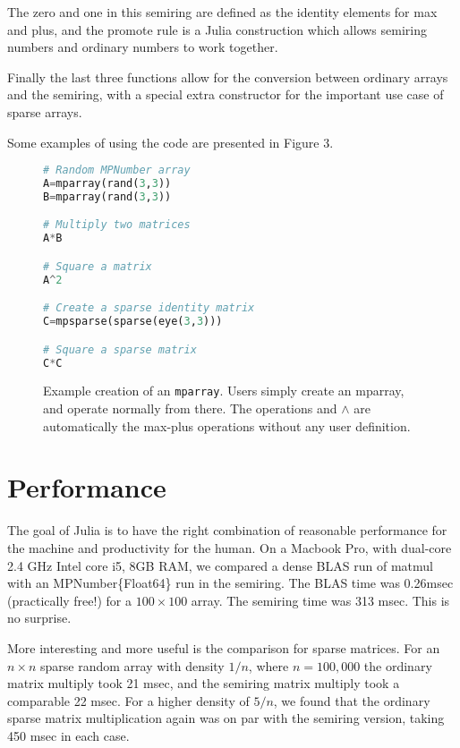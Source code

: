 \documentclass[conference]{IEEEtran}
\begin{document}
The zero and one in this semiring are defined as the identity elements for max and plus,
and the promote rule is a Julia construction which allows semiring numbers and ordinary
numbers to work together.

Finally the last three functions allow for the conversion between ordinary arrays and the semiring, with a special extra constructor for the important use case of sparse arrays.

Some examples of using the code are presented in Figure 3.

\begin{figure}[h]
\begin{lstlisting}[language=python, frame=single]
# Random MPNumber array
A=mparray(rand(3,3)) 
B=mparray(rand(3,3))

# Multiply two matrices
A*B

# Square a matrix
A^2

# Create a sparse identity matrix
C=mpsparse(sparse(eye(3,3)))

# Square a sparse matrix
C*C
\end{lstlisting}
\label{fig:example}
\caption{Example creation of an {\tt mparray}.
Users simply create an mparray, and operate normally from there.
The operations {\tt *} and $\wedge$  are automatically the max-plus operations without any user definition.}
\end{figure}

\section{Performance}


The goal of Julia is to have the right combination of reasonable performance
for the machine and productivity for the human.  
On a Macbook Pro, with dual-core 2.4 GHz Intel core i5, 8GB RAM, we compared a dense BLAS run of matmul with an MPNumber\{Float64\} run in the semiring.
The BLAS time was 0.26msec (practically free!) for a $100 \times 100$ array.  The semiring time
was 313 msec.  This is no surprise.

More interesting and more useful is the comparison for sparse
matrices.  For an $n \times n$ sparse random array with density $1/n$,
where $n = 100,000$ the ordinary matrix multiply took 21 msec, and the
semiring matrix multiply took a comparable 22 msec. For a higher
density of $5/n$, we found that the ordinary sparse matrix
multiplication again was on par with the semiring version, taking 450
msec in each case.
\end{document}
